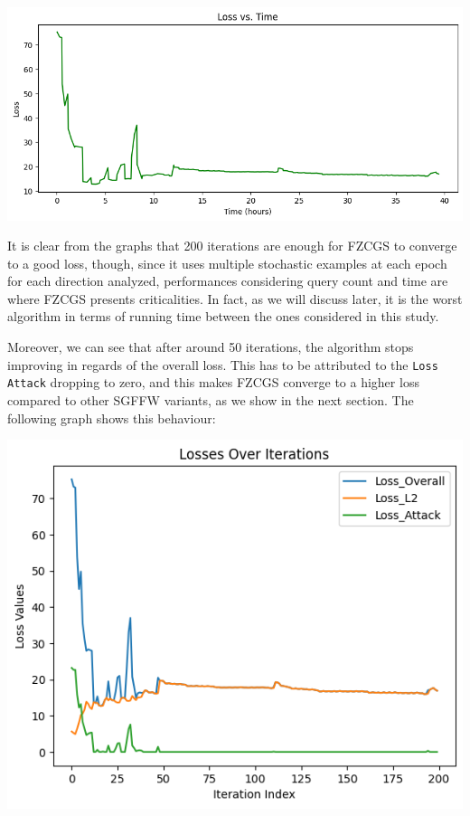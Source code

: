 \documentclass[10pt,twocolumn,letterpaper]{article}
\begin{document}
\begin{center}
   \includegraphics*[scale=0.35]{img/FZCGS_loss_vs_runningtime.png}
\end{center}

It is clear from the graphs that 200 iterations are enough for FZCGS to converge to a good loss,
though, since it uses multiple stochastic examples at each epoch for each direction analyzed, 
performances considering query count and time are where FZCGS presents criticalities.
In fact, as we will discuss later, it is the worst algorithm in terms of running time between the ones
considered in this study. 

Moreover, we can see that after around 50 iterations, the algorithm stops 
improving in regards of the overall loss. This has to be attributed to the \texttt{Loss Attack} dropping
to zero, and this makes FZCGS converge to a higher loss compared to other SGFFW variants, as we show in the next section.
The following graph shows this behaviour:

\begin{center}
   \includegraphics*[scale=0.45]{img/FZCGS_Losses.png}
\end{center}
\end{document}
